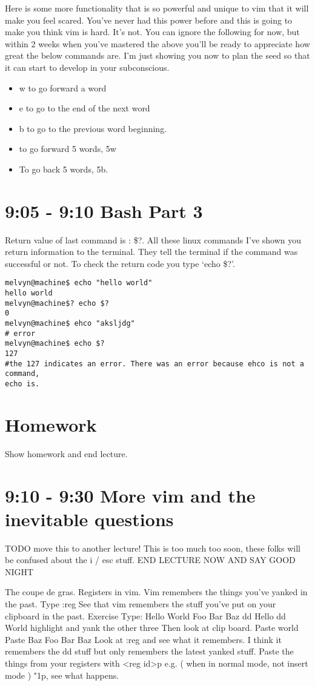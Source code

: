 \documentclass[10pt]{article}
\begin{document}
Here is some more functionality that is so powerful and unique to vim that it
will make you feel scared. You've never had this power before and this is going
to make you think vim is hard. It's not. You can ignore the following for now,
but within 2 weeks when you've mastered the above you'll be ready to appreciate
how great the below commands are. I'm just showing you now to plan the seed so
that it can start to develop in your subconscious.

\begin{itemize}
\item w to go forward a word
\item e to go to the end of the next word
\item b to go to the previous word beginning.
\item to go forward 5 words, 5w
\item To go back 5 words, 5b.
\end{itemize}

\section*{ 9:05 - 9:10 Bash Part 3 }

Return value of last command is : \$?. All these linux commands I've shown you
return information to the terminal. They tell the terminal if the command was
successful or not. To check the return code you type `echo \$?'.

\begin{lstlisting}[style=term]
melvyn@machine$ echo "hello world"
hello world 
melvyn@machine$? echo $?
0
melvyn@machine$ ehco "aksljdg"
# error
melvyn@machine$ echo $?
127
#the 127 indicates an error. There was an error because ehco is not a command,
echo is.
\end{lstlisting}

\section{Homework}
Show homework and end lecture.

\section{ 9:10 - 9:30 More vim and the inevitable questions }
TODO move this to another lecture! 
This is too much too soon, these folks will be confused about the i / esc stuff.
END LECTURE NOW AND SAY GOOD NIGHT


The coupe de gras. Registers in vim. Vim remembers the things you've yanked in the past. Type :reg
See that vim remembers the stuff you've put on your clipboard in the past.
Exercise
Type:
Hello
World
Foo
Bar
Baz
dd Hello
dd World
highlight and yank the other three
Then look at clip board.
Paste world
Paste Baz
Foo
Bar
Baz
Look at :reg and see what it remembers. I think it remembers the dd stuff but only remembers the latest yanked stuff.
Paste the things from your registers with <reg id>p e.g. ( when  in normal mode, not insert mode ) "1p, see what happens. 
\end{document}
